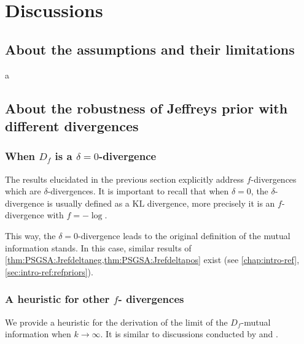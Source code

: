 \section{Discussions}

    \subsection{About the assumptions and their limitations}

    a

    \subsection{About the robustness of Jeffreys prior with different divergences}


        \subsubsection{When $D_f$ is a $\delta=0$-divergence}

        The results elucidated in the previous section %
        explicitly address $f$-divergences which are $\delta$-divergences.
        It is important to recall that when $\delta=0$, the $\delta$-divergence is usually defined as a  $\text{KL}$ divergence, more precisely it is an $f$-divergence with $f=-\log$.

        This way, the $\delta=0$-divergence leads to the original definition of the mutual information stands.
        In this case, similar results of \cref{thm:PSGSA:Jrefdeltaneg,thm:PSGSA:Jrefdeltapos} exist (see \cref{chap:intro-ref}, \cref{sec:intro-ref:refpriors}). 
        



        \subsubsection{A heuristic for other $f$- divergences}

        We provide a heuristic for the derivation of the limit of the $D_f$-mutual information when $k\to\infty$. It is similar to discussions conducted by \citet{mure_objective_2018} and \citet{xie_minimax_1997}.

